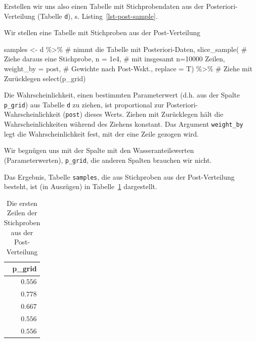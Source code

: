 \documentclass[
  a4paper,
  DIV=11]{scrreprt}
\newenvironment{Shaded}{\begin{snugshade}}{\end{snugshade}}
\newcommand{\AttributeTok}[1]{\textcolor[rgb]{0.40,0.45,0.13}{#1}}
\newcommand{\CommentTok}[1]{\textcolor[rgb]{0.37,0.37,0.37}{#1}}
\newcommand{\FloatTok}[1]{\textcolor[rgb]{0.68,0.00,0.00}{#1}}
\newcommand{\FunctionTok}[1]{\textcolor[rgb]{0.28,0.35,0.67}{#1}}
\newcommand{\NormalTok}[1]{\textcolor[rgb]{0.00,0.23,0.31}{#1}}
\newcommand{\OtherTok}[1]{\textcolor[rgb]{0.00,0.23,0.31}{#1}}
\newcommand{\SpecialCharTok}[1]{\textcolor[rgb]{0.37,0.37,0.37}{#1}}
\theoremstyle{definition}
\theoremstyle{remark}
\begin{document}
Erstellen wir uns also einen Tabelle mit Stichprobendaten aus der
Posteriori-Verteilung (Tabelle \texttt{d}), s.
Listing~\ref{lst-post-sample}.

\begin{codelisting}

\caption{Wir stellen eine Tabelle mit Stichproben aus der
Post-Verteilung}

\hypertarget{lst-post-sample}{%
\label{lst-post-sample}}%
\begin{Shaded}
\begin{Highlighting}[]
\NormalTok{samples }\OtherTok{\textless{}{-}}
\NormalTok{  d }\SpecialCharTok{\%\textgreater{}\%}  \CommentTok{\# nimmt die Tabelle mit Posteriori{-}Daten,}
  \FunctionTok{slice\_sample}\NormalTok{(  }\CommentTok{\# Ziehe daraus eine Stichprobe,}
    \AttributeTok{n =} \FloatTok{1e4}\NormalTok{,  }\CommentTok{\# mit insgesamt n=10000 Zeilen,}
    \AttributeTok{weight\_by =}\NormalTok{ post,  }\CommentTok{\# Gewichte nach Post{-}Wskt.,}
    \AttributeTok{replace =}\NormalTok{ T)  }\SpecialCharTok{\%\textgreater{}\%}  \CommentTok{\# Ziehe mit Zurücklegen}
  \FunctionTok{select}\NormalTok{(p\_grid)}
\end{Highlighting}
\end{Shaded}

\end{codelisting}

Die Wahrscheinlichkeit, einen bestimmten Parameterwert (d.h. aus der
Spalte \texttt{p\_grid}) aus Tabelle \texttt{d} zu ziehen, ist
proportional zur Posteriori-Wahrscheinlichkeit (\texttt{post}) dieses
Werts. Ziehen mit Zurücklegen hält die Wahrscheinlichkeiten während des
Ziehens konstant. Das Argument \texttt{weight\_by} legt die
Wahrscheinlichkeit fest, mit der eine Zeile gezogen wird.

Wir begnügen uns mit der Spalte mit den Wasseranteilswerten
(Parameterwerten), \texttt{p\_grid}, die anderen Spalten brauchen wir
nicht.

Das Ergebnis, Tabelle \texttt{samples}, die aus Stichproben aus der
Post-Verteilung besteht, ist (in Auszügen) in
Tabelle~\ref{tbl-postsample1} dargestellt.

\hypertarget{tbl-postsample1}{}
\begin{longtable}{r}
\caption{\label{tbl-postsample1}Die ersten Zeilen der Stichproben aus der Post-Verteilung }\tabularnewline

\toprule
p\_grid \\ 
\midrule
$0.556$ \\ 
$0.778$ \\ 
$0.667$ \\ 
$0.556$ \\ 
$0.556$ \\ 
\bottomrule
\end{longtable}
\end{document}
